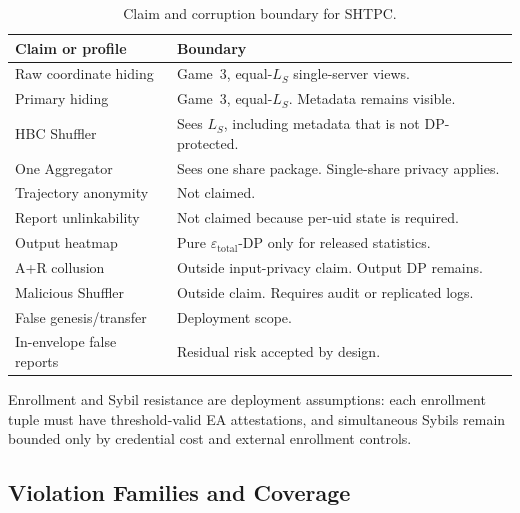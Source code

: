 \documentclass[journal]{IEEEtran}
\theoremstyle{definition}
\theoremstyle{plain}
\begin{document}
\begin{table}[t]
  \centering
  \caption{Claim and corruption boundary for \textsc{SHTPC}.}
  \label{tab:privacy-boundary}
  \label{tab:corruption-matrix}
  \scriptsize
  \setlength{\tabcolsep}{2pt}
  \renewcommand{\arraystretch}{1.02}
  \begin{tabularx}{\columnwidth}{@{}p{2.15cm}X@{}}
    \toprule
    Claim or profile & Boundary \\
    \midrule
    Raw coordinate hiding & Game~3, equal-\(L_S\) single-server views. \\
    Primary hiding & Game~3, equal-\(L_S\). Metadata remains visible. \\
    HBC Shuffler & Sees \(L_S\), including metadata that is not DP-protected. \\
    One Aggregator & Sees one share package. Single-share privacy applies. \\
    Trajectory anonymity & Not claimed. \\
    Report unlinkability & Not claimed because per-uid state is required. \\
    Output heatmap & Pure \(\varepsilon_{\mathrm{total}}\)-DP only for released statistics. \\
    A+R collusion & Outside input-privacy claim. Output DP remains. \\
    Malicious Shuffler & Outside claim. Requires audit or replicated logs. \\
    False genesis/transfer & Deployment scope. \\
    In-envelope false reports & Residual risk accepted by design. \\
    \bottomrule
  \end{tabularx}
\end{table}

Enrollment and Sybil resistance are deployment assumptions: each enrollment
tuple must have threshold-valid EA attestations, and simultaneous Sybils remain
bounded only by credential cost and external enrollment controls.

\subsection{Violation Families and Coverage}
\label{sec:taxonomy}
\end{document}
